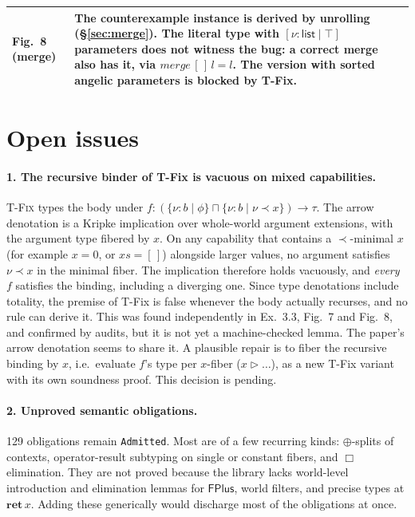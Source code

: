 \documentclass[10pt]{article}
\newcommand{\ov}[2]{\{\nu{:}#1 \mid #2\}}          %
\newcommand{\un}[2]{[\nu{:}#1 \mid #2]}            %
\newcommand{\List}{\mathsf{list}}
\newcommand{\inter}{\sqcap}
\newcommand{\Sum}{\oplus}
\newcommand{\pers}{\Box}
\newcommand{\kw}[1]{\ensuremath{\mathbf{#1}}}
\newcommand{\rocq}[1]{\texttt{#1}}
\newcommand{\RN}[1]{\textsc{#1}}
\begin{document}
\begin{center}
\begin{tabular}{p{}p{}}
Fig.~8 (merge) & The counterexample instance is derived by unrolling (\S\ref{sec:merge}). The literal type with $\un{\List}{\top}$ parameters does not witness the bug: a correct merge also has it, via $\mathit{merge}\,[\,]\,l=l$. The version with sorted angelic parameters is blocked by T-Fix.\\
\bottomrule
\end{tabular}
\end{center}

\section{Open issues}\label{sec:open}

\paragraph{1. The recursive binder of T-Fix is vacuous on mixed capabilities.}
\RN{T-Fix} types the body under
$f : (\ov{b}{\phi}\inter\ov{b}{\nu\prec x})\to\tau$. The arrow denotation is a
Kripke implication over whole-world argument extensions, with the argument
type fibered by $x$. On any capability that contains a $\prec$-minimal $x$
(for example $x=0$, or $xs=[\,]$) alongside larger values, no argument satisfies
$\nu\prec x$ in the minimal fiber. The implication therefore holds vacuously,
and \emph{every} $f$ satisfies the binding, including a diverging one. Since
type denotations include totality, the premise of T-Fix is false whenever the
body actually recurses, and no rule can derive it. This was found
independently in Ex.~3.3, Fig.~7 and Fig.~8, and confirmed by audits, but it is
not yet a machine-checked lemma. The paper's arrow denotation seems to share
it. A plausible repair is to fiber the recursive binding by $x$, i.e.\ evaluate
$f$'s type per $x$-fiber ($x\triangleright\ldots$), as a new T-Fix variant
with its own soundness proof. This decision is pending.

\paragraph{2. Unproved semantic obligations.} 129 obligations remain
\rocq{Admitted}. Most are of a few recurring kinds: $\Sum$-splits of contexts,
operator-result subtyping on single or constant fibers, and $\pers$
elimination. They are not proved because the library lacks world-level
introduction and elimination lemmas for $\mathsf{FPlus}$, world filters, and
precise types at $\kw{ret}\,x$. Adding these generically would discharge
most of the obligations at once.
\end{document}
